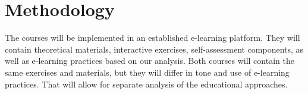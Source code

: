 



\section{Methodology}

The courses will be implemented in an established e-learning platform. They will contain theoretical materials, interactive exercises, self-assessment components, as well as e-learning practices based on our analysis. Both courses will contain the same exercises and materials, but they will differ in tone and use of e-learning practices. That will allow for separate analysis of the educational approaches.

